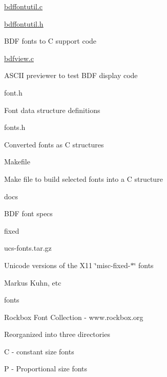 \begin{DoxyItemize}
\begin{DoxyItemize}
\begin{DoxyItemize}
\begin{DoxyItemize}
\end{DoxyItemize}
\item \hyperlink{bdffontutil_8c}{bdffontutil.\-c}
\item \hyperlink{bdffontutil_8h}{bdffontutil.\-h}
\begin{DoxyItemize}
\item B\-D\-F fonts to C support code
\end{DoxyItemize}
\item \hyperlink{bdfview_8c}{bdfview.\-c}
\begin{DoxyItemize}
\item A\-S\-C\-I\-I previewer to test B\-D\-F display code
\end{DoxyItemize}
\item font.\-h
\begin{DoxyItemize}
\item Font data structure definitions
\end{DoxyItemize}
\item fonts.\-h
\begin{DoxyItemize}
\item Converted fonts as C structures
\end{DoxyItemize}
\item Makefile
\begin{DoxyItemize}
\item Make file to build selected fonts into a C structure
\end{DoxyItemize}
\item docs
\begin{DoxyItemize}
\item B\-D\-F font specs
\end{DoxyItemize}
\item fixed
\begin{DoxyItemize}
\item ucs-\/fonts.\-tar.\-gz
\item Unicode versions of the X11 \char`\"{}misc-\/fixed-\/$\ast$\char`\"{} fonts
\item Markus Kuhn, etc
\end{DoxyItemize}
\item fonts
\begin{DoxyItemize}
\item Rockbox Font Collection -\/ www.\-rockbox.\-org
\item Reorganized into three directories
\begin{DoxyItemize}
\item C -\/ constant size fonts
\item P -\/ Proportional size fonts

\end{DoxyItemize}
\end{DoxyItemize}
\end{DoxyItemize}
\end{DoxyItemize}
\end{DoxyItemize}
